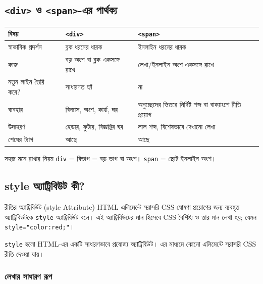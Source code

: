 \subsection{\texttt{<div>} ও \texttt{<span>}-এর পার্থক্য}

\begin{center}
\begin{tabular}{|p{}|p{}|p{}|}
\hline
\textbf{বিষয়} & \textbf{\texttt{<div>}} & \textbf{\texttt{<span>}} \\
\hline
স্বাভাবিক প্রদর্শন & ব্লক ধরনের ধারক & ইনলাইন ধরনের ধারক \\
\hline
কাজ & বড় অংশ বা ব্লক একসঙ্গে রাখে & লেখা/ইনলাইন অংশ একসঙ্গে রাখে \\
\hline
নতুন লাইন তৈরি করে? & সাধারণত হ্যাঁ & না \\
\hline
ব্যবহার & বিন্যাস, অংশ, কার্ড, ঘর & অনুচ্ছেদের ভিতরে নির্দিষ্ট শব্দ বা বাক্যাংশে রীতি প্রয়োগ \\
\hline
উদাহরণ & হেডার, ফুটার, বিজ্ঞপ্তির ঘর & লাল শব্দ, বিশেষভাবে দেখানো লেখা \\
\hline
শেষের ট্যাগ & আছে & আছে \\
\hline
\end{tabular}
\end{center}

\begin{keypointbox}{সহজ মনে রাখার নিয়ম}
\texttt{div} = বিভাগ = বড় ভাগ বা অংশ। \texttt{span} = ছোট ইনলাইন অংশ।
\end{keypointbox}

\subsection{style অ্যাট্রিবিউট কী?}

\begin{definitionbox}{রীতির অ্যাট্রিবিউট (style Attribute)}
HTML এলিমেন্টে সরাসরি CSS ঘোষণা প্রয়োগের জন্য ব্যবহৃত অ্যাট্রিবিউটকে \texttt{style} অ্যাট্রিবিউট বলে। এই অ্যাট্রিবিউটের মান হিসেবে CSS বৈশিষ্ট্য ও তার মান লেখা হয়; যেমন \texttt{style="color:red;"}।
\end{definitionbox}

\texttt{style} হলো HTML-এর একটি সাধারণভাবে প্রযোজ্য অ্যাট্রিবিউট। এর মাধ্যমে কোনো এলিমেন্টে সরাসরি CSS রীতি দেওয়া যায়।

\subsubsection{লেখার সাধারণ রূপ}

